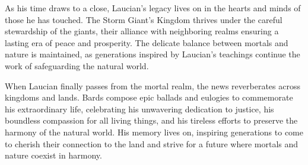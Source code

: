 \documentclass[letterpaper,openany,oneside,twocolumn]{book}
\begin{document}
As his time draws to a close, Laucian's legacy lives on in the hearts and minds of those he has touched. The Storm Giant's Kingdom thrives under the careful stewardship of the giants, their alliance with neighboring realms ensuring a lasting era of peace and prosperity. The delicate balance between mortals and nature is maintained, as generations inspired by Laucian's teachings continue the work of safeguarding the natural world.

When Laucian finally passes from the mortal realm, the news reverberates across kingdoms and lands. Bards compose epic ballads and eulogies to commemorate his extraordinary life, celebrating his unwavering dedication to justice, his boundless compassion for all living things, and his tireless efforts to preserve the harmony of the natural world. His memory lives on, inspiring generations to come to cherish their connection to the land and strive for a future where mortals and nature coexist in harmony.
\end{document}
